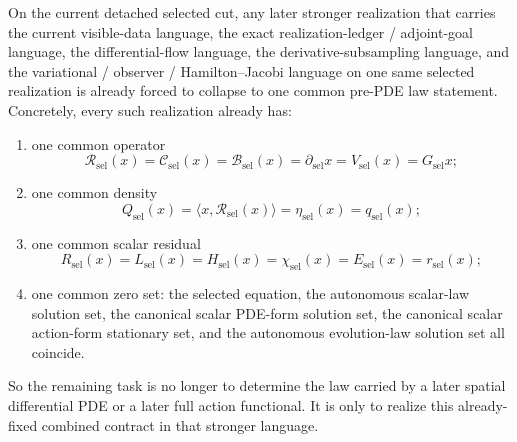 \begin{theorem}
\label{thm:the-selected-cut-already-fixes-the-exact-combined-pre-pde-contract-for-any-later-stronger-flagship-realization}
On the current detached selected cut, any later stronger realization
that carries the current visible-data language, the exact realization-ledger /
adjoint-goal language, the differential-flow language, the
derivative-subsampling language, and the variational / observer /
Hamilton--Jacobi language on one same selected realization is already forced
to collapse to one common pre-PDE law statement. Concretely, every such
realization already has:
\begin{enumerate}
\item one common operator
\[
\mathcal R_{\mathrm{sel}}(x)
 =\mathcal C_{\mathrm{sel}}(x)
 =\mathcal B_{\mathrm{sel}}(x)
 =\partial_{\mathrm{sel}}x
 =V_{\mathrm{sel}}(x)
 =G_{\mathrm{sel}}x;
\]
\item one common density
\[
Q_{\mathrm{sel}}(x)
 =\langle x,\mathcal R_{\mathrm{sel}}(x)\rangle
 =\eta_{\mathrm{sel}}(x)
 =q_{\mathrm{sel}}(x);
\]
\item one common scalar residual
\[
R_{\mathrm{sel}}(x)
 =L_{\mathrm{sel}}(x)
 =H_{\mathrm{sel}}(x)
 =\chi_{\mathrm{sel}}(x)
 =E_{\mathrm{sel}}(x)
 =r_{\mathrm{sel}}(x);
\]
\item one common zero set: the selected equation, the autonomous scalar-law
      solution set, the canonical scalar PDE-form solution set, the canonical
      scalar action-form stationary set, and the autonomous evolution-law
      solution set all coincide.
\end{enumerate}
So the remaining task is no longer to determine the law carried by a later
spatial differential PDE or a later full action functional. It is only to
realize this already-fixed combined contract in that stronger language.
\end{theorem}

